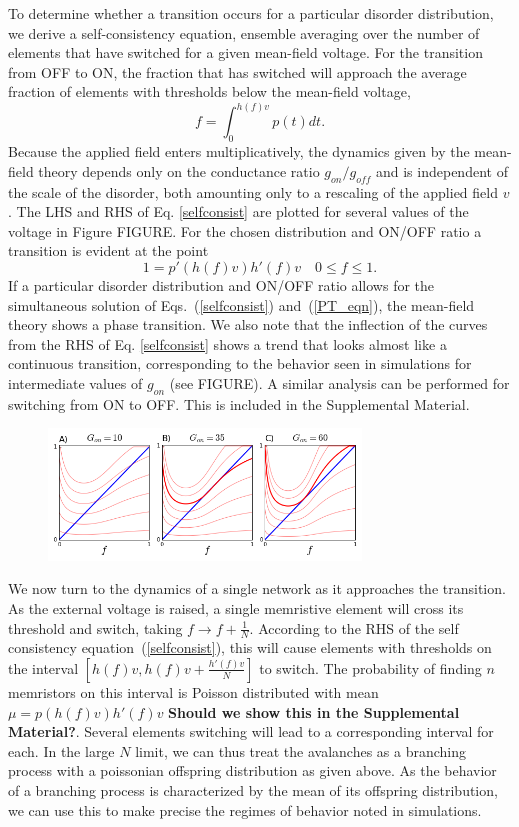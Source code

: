 \documentclass[aps,prl,reprint,groupedaddress]{revtex4-1}
\begin{document}
To determine whether a transition occurs for a particular disorder
distribution, we derive a
self-consistency equation, ensemble averaging over the number of elements
that have switched for a given mean-field voltage. For the transition from
OFF to ON, the fraction that has switched will approach the average fraction
of elements with thresholds below the mean-field voltage,
\begin{equation}\label{selfconsist}
f = \int_0^{h(f) v} p(t) dt.
\end{equation}
Because the applied field enters multiplicatively, the dynamics given by
the mean-field theory depends only on the conductance ratio $g_{on}/g_{off}$
and is independent of the scale of the disorder, both amounting only to
a rescaling of the applied field $v$.  The LHS and
RHS of Eq. \ref{selfconsist} are plotted for several values of the voltage
in Figure FIGURE.  For
the chosen distribution and ON/OFF ratio a transition is evident at the
point
\begin{equation}\label{PT_eqn}
1 = p'(h(f)v)h'(f)v \quad 0\le f\le 1.
\end{equation}
If a particular disorder distribution and ON/OFF ratio allows for the
simultaneous solution of Eqs.~(\ref{selfconsist}) and~(\ref{PT_eqn}), the mean-field
theory shows a phase transition. We also note that the inflection
of the curves from the RHS of Eq. \ref{selfconsist} shows a trend that looks almost like a continuous
transition, corresponding to the behavior seen in simulations for intermediate
values of $g_{on}$ (see FIGURE).
A similar analysis can be performed
for switching from ON to OFF. This is included in the Supplemental Material.

\begin{figure}
\includegraphics[width=8.3cm]{MF_self_consist.png}
\caption{\label{MF_SC_fig}}
\end{figure}

We now turn to the dynamics of a single network as it approaches the
transition.  As the external voltage is raised, a single memristive element
will cross its threshold and switch, taking $f\to f + \frac{1}{N}$.
According to the RHS of the self consistency equation~(\ref{selfconsist}),
this will cause
elements with thresholds on the interval $[h(f)v, h(f)v + \frac{h'(f)v}{N}]$
to switch.  The probability of finding $n$ memristors on this interval is
Poisson distributed with mean $\mu = p(h(f)v)h'(f)v$ {\bf Should we show this in the Supplemental Material?}. Several elements
switching will lead to a corresponding interval for each. In the large $N$
limit, we can thus treat the avalanches as a branching process with a
poissonian offspring distribution as given above.  As the behavior of a
branching process is characterized by the mean of its offspring distribution,
we can use this to make precise the regimes of behavior noted in simulations.
\end{document}
